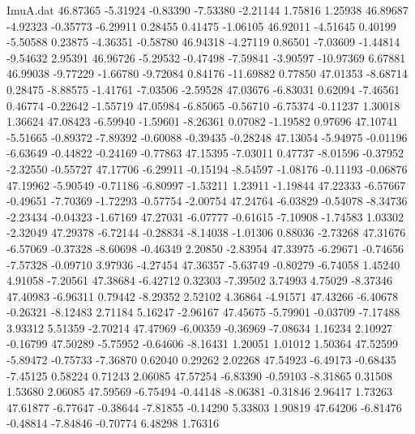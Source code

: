 \begin{filecontents}{ImuA.dat}
  46.87365   -5.31924   -0.83390   -7.53380   -2.21144    1.75816    1.25938
  46.89687   -4.92323   -0.35773   -6.29911    0.28455    0.41475   -1.06105
  46.92011   -4.51645    0.40199   -5.50588    0.23875   -4.36351   -0.58780
  46.94318   -4.27119    0.86501   -7.03609   -1.44814   -9.54632    2.95391
  46.96726   -5.29532   -0.47498   -7.59841   -3.90597  -10.97369    6.67881
  46.99038   -9.77229   -1.66780   -9.72084    0.84176  -11.69882    0.77850
  47.01353   -8.68714    0.28475   -8.88575   -1.41761   -7.03506   -2.59528
  47.03676   -6.83031    0.62094   -7.46561    0.46774   -0.22642   -1.55719
  47.05984   -6.85065   -0.56710   -6.75374   -0.11237    1.30018    1.36624
  47.08423   -6.59940   -1.59601   -8.26361    0.07082   -1.19582    0.97696
  47.10741   -5.51665   -0.89372   -7.89392   -0.60088   -0.39435   -0.28248
  47.13054   -5.94975   -0.01196   -6.63649   -0.44822   -0.24169   -0.77863
  47.15395   -7.03011    0.47737   -8.01596   -0.37952   -2.32550   -0.55727
  47.17706   -6.29911   -0.15194   -8.54597   -1.08176   -0.11193   -0.06876
  47.19962   -5.90549   -0.71186   -6.80997   -1.53211    1.23911   -1.19844
  47.22333   -6.57667   -0.49651   -7.70369   -1.72293   -0.57754   -2.00754
  47.24764   -6.03829   -0.54078   -8.34736   -2.23434   -0.04323   -1.67169
  47.27031   -6.07777   -0.61615   -7.10908   -1.74583    1.03302   -2.32049
  47.29378   -6.72144   -0.28834   -8.14038   -1.01306    0.88036   -2.73268
  47.31676   -6.57069   -0.37328   -8.60698   -0.46349    2.20850   -2.83954
  47.33975   -6.29671   -0.74656   -7.57328   -0.09710    3.97936   -4.27454
  47.36357   -5.63749   -0.80279   -6.74058    1.45240    4.91058   -7.20561
  47.38684   -6.42712    0.32303   -7.39502    3.74993    4.75029   -8.37346
  47.40983   -6.96311    0.79442   -8.29352    2.52102    4.36864   -4.91571
  47.43266   -6.40678   -0.26321   -8.12483    2.71184    5.16247   -2.96167
  47.45675   -5.79901   -0.03709   -7.17488    3.93312    5.51359   -2.70214
  47.47969   -6.00359   -0.36969   -7.08634    1.16234    2.10927   -0.16799
  47.50289   -5.75952   -0.64606   -8.16431    1.20051    1.01012    1.50364
  47.52599   -5.89472   -0.75733   -7.36870    0.62040    0.29262    2.02268
  47.54923   -6.49173   -0.68435   -7.45125    0.58224    0.71243    2.06085
  47.57254   -6.83390   -0.59103   -8.31865    0.31508    1.53680    2.06085
  47.59569   -6.75494   -0.44148   -8.06381   -0.31846    2.96417    1.73263
  47.61877   -6.77647   -0.38644   -7.81855   -0.14290    5.33803    1.90819
  47.64206   -6.81476   -0.48814   -7.84846   -0.70774    6.48298    1.76316

\end{filecontents}
